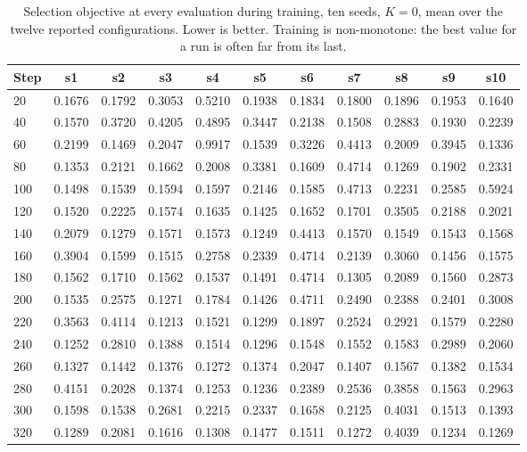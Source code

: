 \begin{table}[htbp]
\centering
\scriptsize
\caption{Selection objective at every evaluation during training, ten seeds,
$K{=}0$, mean over the twelve reported configurations. Lower is better.
Training is non-monotone: the best value for a run is often far from its
last.}
\label{tab:traces}
\begin{tabular}{@{}lcccccccccc@{}}
\toprule
Step & s1 & s2 & s3 & s4 & s5 & s6 & s7 & s8 & s9 & s10 \\
\midrule
20 & 0.1676 & 0.1792 & 0.3053 & 0.5210 & 0.1938 & 0.1834 & 0.1800 & 0.1896 & 0.1953 & 0.1640 \\
40 & 0.1570 & 0.3720 & 0.4205 & 0.4895 & 0.3447 & 0.2138 & 0.1508 & 0.2883 & 0.1930 & 0.2239 \\
60 & 0.2199 & 0.1469 & 0.2047 & 0.9917 & 0.1539 & 0.3226 & 0.4413 & 0.2009 & 0.3945 & 0.1336 \\
80 & 0.1353 & 0.2121 & 0.1662 & 0.2008 & 0.3381 & 0.1609 & 0.4714 & 0.1269 & 0.1902 & 0.2331 \\
100 & 0.1498 & 0.1539 & 0.1594 & 0.1597 & 0.2146 & 0.1585 & 0.4713 & 0.2231 & 0.2585 & 0.5924 \\
120 & 0.1520 & 0.2225 & 0.1574 & 0.1635 & 0.1425 & 0.1652 & 0.1701 & 0.3505 & 0.2188 & 0.2021 \\
140 & 0.2079 & 0.1279 & 0.1571 & 0.1573 & 0.1249 & 0.4413 & 0.1570 & 0.1549 & 0.1543 & 0.1568 \\
160 & 0.3904 & 0.1599 & 0.1515 & 0.2758 & 0.2339 & 0.4714 & 0.2139 & 0.3060 & 0.1456 & 0.1575 \\
180 & 0.1562 & 0.1710 & 0.1562 & 0.1537 & 0.1491 & 0.4714 & 0.1305 & 0.2089 & 0.1560 & 0.2873 \\
200 & 0.1535 & 0.2575 & 0.1271 & 0.1784 & 0.1426 & 0.4711 & 0.2490 & 0.2388 & 0.2401 & 0.3008 \\
220 & 0.3563 & 0.4114 & 0.1213 & 0.1521 & 0.1299 & 0.1897 & 0.2524 & 0.2921 & 0.1579 & 0.2280 \\
240 & 0.1252 & 0.2810 & 0.1388 & 0.1514 & 0.1296 & 0.1548 & 0.1552 & 0.1583 & 0.2989 & 0.2060 \\
260 & 0.1327 & 0.1442 & 0.1376 & 0.1272 & 0.1374 & 0.2047 & 0.1407 & 0.1567 & 0.1382 & 0.1534 \\
280 & 0.4151 & 0.2028 & 0.1374 & 0.1253 & 0.1236 & 0.2389 & 0.2536 & 0.3858 & 0.1563 & 0.2963 \\
300 & 0.1598 & 0.1538 & 0.2681 & 0.2215 & 0.2337 & 0.1658 & 0.2125 & 0.4031 & 0.1513 & 0.1393 \\
320 & 0.1289 & 0.2081 & 0.1616 & 0.1308 & 0.1477 & 0.1511 & 0.1272 & 0.4039 & 0.1234 & 0.1269 \\

\end{tabular}
\end{table}
